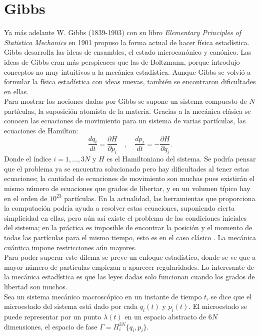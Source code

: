 \section{Gibbs}
Ya más adelante W. Gibbs (1839-1903) con su libro \textit{Elementary Principles of Statistica Mechanics} en 1901 propuso la forma actual de hacer física estadística. Gibbs desarrolla las ideas de ensambles, el estado  microcanónico y canónico. Las ideas de Gibbs eran más perspicaces que las de Boltzmann, porque introdujo conceptos no muy intuitivos a la mecánica estadística. Aunque Gibbs se volvió a formular la física estadística con ideas nuevas, también se encontraron dificultades en ellas. \\
Para mostrar los nociones dadas por Gibbs se supone un sistema compuesto de $N$ partículas, la suposición atomista de la materia. Gracias a la mecánica clásica se conocen las ecuaciones de movimiento para un sistema de varias partículas, las ecuaciones de Hamilton:
\begin{equation} \label{Hamilton}
\frac{dq_{i}}{dt}= \frac{\partial H}{\partial p_{i}} \quad , \quad \frac{d p_{i}}{dt} =-\frac{\partial H}{\partial q_{i}}.
\end{equation}
Donde el índice $i=1,...,3N$ y $H$ es el Hamiltoniano del sistema. Se podría pensar que el problema ya se encuentra solucionado pero hay dificultades al tener estas ecuaciones; la cantidad de ecuaciones de movimiento son muchas pues existirán el mismo número de ecuaciones que grados de libertar, y en un volumen típico hay en el orden de $10^{23}$ partículas. En la actualidad, las herramientas que proporciona la computación podría ayuda a resolver estas ecuaciones, suponiendo cierta simplicidad en ellas, pero aún así existe el problema de las condiciones iniciales del sistema; en la práctica es imposible de encontrar la posición y el momento de todas las partículas para el mismo tiempo, esto es en el caso clásico \cite{LandauStat}. La mecánica cuántica impone restricciones aún mayores.
\\
Para poder superar este dilema se preve un enfoque estadístico, donde se ve que a mayor número de partículas empiezan a aparecer regularidades. Lo interesante de la mecánica estadística es que las leyes dadas solo funcionan cuando los grados de libertad son muchos.
\\
Sea un sistema mecánico macroscópico en un instante de tiempo $t$,  se dice que el microestado del sistema está dado por cada $q_{i}(t)$ y $p_{i}(t)$. El microestado se puede representar por un punto $\lambda(t)$ en un espacio  abstracto de $6N$ dimensiones, el espacio de fase $\Gamma = \Pi^{3N}_{i} \{q_{i}, p_{i} \}$.
